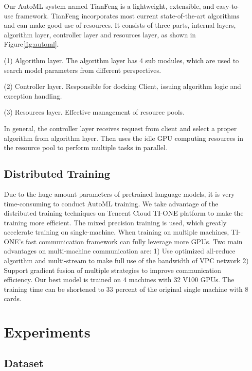 \documentclass[11pt,a4paper]{article}
\begin{document}
Our AutoML system named TianFeng is a lightweight, extensible, and easy-to-use framework. TianFeng incorporates most current state-of-the-art algorithms and can make good use of resources. It consists of three parts, internal layers, algorithm layer, controller layer and resources layer, as shown in Figure\ref{fig:automl}.

(1) Algorithm layer. The algorithm layer has 4 sub modules, which are used to search model parameters from different perspectives.



(2) Controller layer. Responsible for docking Client, issuing algorithm logic and exception handling.

(3) Resources layer. Effective management of resource pools.

In general, the controller layer receives request from client and select a proper algorithm from algorithm layer. Then uses the idle GPU computing resources in the resource pool to perform multiple tasks in parallel.

\subsection{Distributed Training}

Due to the huge amount parameters of pretrained language models, it is very time-consuming to conduct AutoML training. We take advantage of the distributed training techniques on Tencent Cloud TI-ONE platform to make the training more efficient. The mixed precision training is used, which greatly accelerate training on single-machine. When training on multiple machines, TI-ONE's fast communication framework can fully leverage more GPUs. 
Two main advantages on multi-machine communication are: 1) Use optimized all-reduce algorithm and multi-stream to make full use of the bandwidth of VPC network 2) Support gradient fusion of multiple strategies to improve communication efficiency.
Our best model is trained on 4 machines with 32 V100 GPUs. The training time can be shortened to 33 percent of the original single machine with 8 cards.



\section{Experiments}

\subsection{Dataset}
\end{document}
